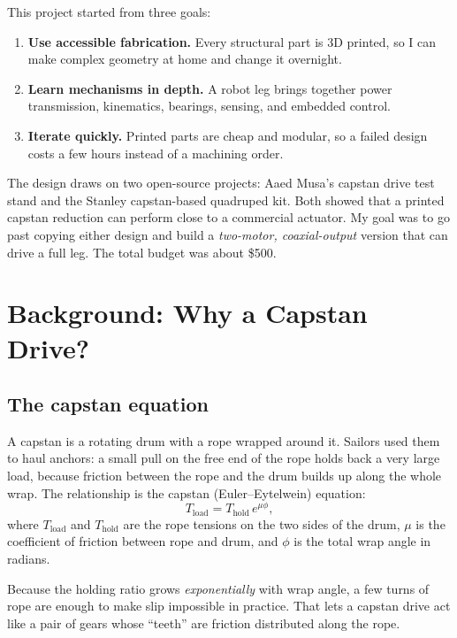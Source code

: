 \documentclass[11pt]{article}
\begin{document}
This project started from three goals:
\begin{enumerate}
  \item \textbf{Use accessible fabrication.} Every structural part is 3D printed,
        so I can make complex geometry at home and change it overnight.
  \item \textbf{Learn mechanisms in depth.} A robot leg brings together power
        transmission, kinematics, bearings, sensing, and embedded control.
  \item \textbf{Iterate quickly.} Printed parts are cheap and modular, so a
        failed design costs a few hours instead of a machining order.
\end{enumerate}

The design draws on two open-source projects: Aaed Musa's capstan drive test
stand and the Stanley capstan-based quadruped kit. Both showed that a printed
capstan reduction can perform close to a commercial actuator. My goal was to go
past copying either design and build a \emph{two-motor, coaxial-output} version
that can drive a full leg. The total budget was about \$500.

\section{Background: Why a Capstan Drive?}

\subsection{The capstan equation}

A capstan is a rotating drum with a rope wrapped around it. Sailors used them to
haul anchors: a small pull on the free end of the rope holds back a very large
load, because friction between the rope and the drum builds up along the whole
wrap. The relationship is the capstan (Euler--Eytelwein) equation:
\begin{equation}
  T_{\text{load}} = T_{\text{hold}}\, e^{\mu \phi},
  \label{eq:capstan}
\end{equation}
where $T_{\text{load}}$ and $T_{\text{hold}}$ are the rope tensions on the two
sides of the drum, $\mu$ is the coefficient of friction between rope and drum,
and $\phi$ is the total wrap angle in radians.

Because the holding ratio grows \emph{exponentially} with wrap angle, a few turns
of rope are enough to make slip impossible in practice. That lets a capstan
drive act like a pair of gears whose ``teeth'' are friction distributed along
the rope.
\end{document}
